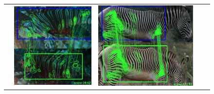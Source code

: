 \begin{figure}
\begin{center}
\begin{tabular}{c c c c c}
&
\includegraphics[height=\correctmatchheight]{figures/FinalImages/cropped/LF_correct_14_cropped}
&
\includegraphics[height=\correctmatchheight]{figures/FinalImages/cropped/GZ_correct_877_cropped}
&

\end{tabular}
\end{center}
\end{figure}
